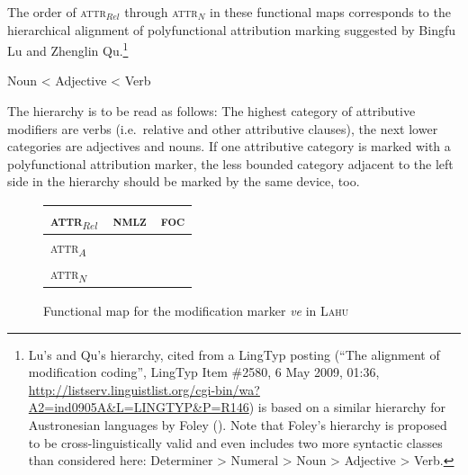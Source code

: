 The order of \textsc{attr}$_{Rel}$ through \textsc{attr}$_{N}$ in these functional maps corresponds to the hierarchical alignment of polyfunctional attribution marking suggested by Bingfu Lu and Zhenglin Qu.\footnote{Lu's and Qu's hierarchy, cited from a LingTyp posting (“The alignment of modification coding”, LingTyp Item \#2580, 6 May 2009, 01:36, \url{http://listserv.linguistlist.org/cgi-bin/wa?A2=ind0905A&L=LINGTYP&P=R146}) is based on a similar hierarchy for Austronesian languages by Foley (\citeyear{foley1980}). Note that Foley's hierarchy is proposed to be cross-linguistically valid and even includes two more syntactic classes than considered here: Determiner > Numeral > Noun > Adjective > Verb.}
\begin{exe}
\ex	Noun < Adjective < Verb
\end{exe}
The hierarchy is to be read as follows: The highest category of attributive modifiers are verbs (i.e.~relative and other attributive clauses), the next lower categories are adjectives and nouns. If one attributive category is marked with a polyfunctional attribution marker, the less bounded category adjacent to the left side in the hierarchy should be marked by the same device, too.
\begin{figure}
\parbox[b]{\textwidth}{
\begin{center}
\begin{tabular}{| l || c | c |}
\cline{1-1}
\\
\hline
\textsc{attr}$_{Rel}$ & \textsc{nmlz} & \textsc{foc}\\
\hline
\textsc{attr}$_{A}$\\
\cline{1-1}
\textsc{attr}$_{N}$\\
\cline{1-1}
\end{tabular}
\end{center}
}
\caption[Functional map for modification marking]{Functional map for the modification marker \textit{ve} in \textsc{Lahu}}
\label{lahu funcmap}
\end{figure}

